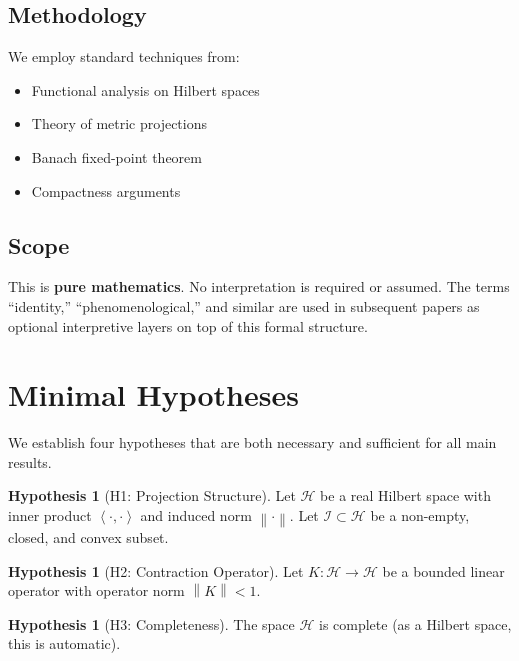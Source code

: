 \documentclass[11pt,a4paper]{article}
\theoremstyle{plain}
\theoremstyle{definition}
\newtheorem{hypothesis}[theorem]{Hypothesis}
\newcommand{\Hilb}{\mathcal{H}}
\newcommand{\I}{\mathcal{I}}
\newcommand{\norm}[1]{\left\lVert #1 \right\rVert}
\newcommand{\inner}[2]{\left\langle #1, #2 \right\rangle}
\begin{document}
\subsection{Methodology}

We employ standard techniques from:
\begin{itemize}
    \item Functional analysis on Hilbert spaces
    \item Theory of metric projections
    \item Banach fixed-point theorem
    \item Compactness arguments
\end{itemize}

\subsection{Scope}

This is \textbf{pure mathematics}. No interpretation is required or assumed. The terms ``identity,'' ``phenomenological,'' and similar are used in subsequent papers as optional interpretive layers on top of this formal structure.

\section{Minimal Hypotheses}

We establish four hypotheses that are both necessary and sufficient for all main results.

\begin{hypothesis}[H1: Projection Structure]\label{hyp:H1}
Let $\Hilb$ be a real Hilbert space with inner product $\inner{\cdot}{\cdot}$ and induced norm $\norm{\cdot}$. Let $\I \subset \Hilb$ be a non-empty, closed, and convex subset.
\end{hypothesis}

\begin{hypothesis}[H2: Contraction Operator]\label{hyp:H2}
Let $K: \Hilb \to \Hilb$ be a bounded linear operator with operator norm $\norm{K} < 1$.
\end{hypothesis}

\begin{hypothesis}[H3: Completeness]\label{hyp:H3}
The space $\Hilb$ is complete (as a Hilbert space, this is automatic).
\end{hypothesis}
\end{document}
